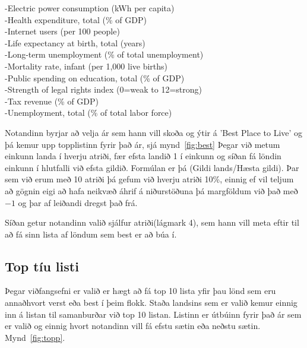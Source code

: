 \documentclass[paper=a4, fontsize=11pt]{scrartcl}
\begin{document}
\vspace{1mm}
\noindent
-Electric power consumption (kWh per capita)\\
-Health expenditure, total (\% of GDP)\\
-Internet users (per 100 people)\\
-Life expectancy at birth, total (years)\\
-Long-term unemployment (\% of total unemployment)\\
-Mortality rate, infant (per 1,000 live births)\\
-Public spending on education, total (\% of GDP)\\
-Strength of legal rights index (0=weak to 12=strong)\\
-Tax revenue (\% of GDP)\\
-Unemployment, total (\% of total labor force)\\
\vspace{1mm}
\par
Notandinn byrjar að velja ár sem hann vill skoða og ýtir á 'Best Place to Live' og þá kemur upp topplistinn fyrir það ár, sjá mynd~\ref{fig:best}
Þegar við metum einkunn landa í hverju atriði, fær efsta landið 1 í einkunn og síðan fá löndin einkunn í hlutfalli við efsta gildið. Formúlan er þá (Gildi lands/Hæsta gildi). Þar sem við erum með 10 atriði þá gefum við hverju atriði 10\%, einnig ef vil teljum að gögnin eigi að hafa neikvæð áhrif á niðurstöðuna þá margföldum við það með $ -1 $ og þar af leiðandi dregst það frá.\par
Síðan getur notandinn valið sjálfur atriði(lágmark 4), sem hann vill meta eftir til að fá sinn lista af löndum sem best er að búa í. 

\subsection{Top tíu listi}
Þegar viðfangsefni er valið er hægt að fá top 10 lista yfir þau lönd sem eru annaðhvort verst eða best í þeim flokk. Staða landsins sem er valið kemur einnig inn á listan til samanburðar við top 10 listan. Listinn er útbúinn fyrir það ár sem er valið og einnig hvort notandinn vill fá efstu sætin eða neðstu sætin. Mynd~\ref{fig:topp}.
\\
\end{document}
